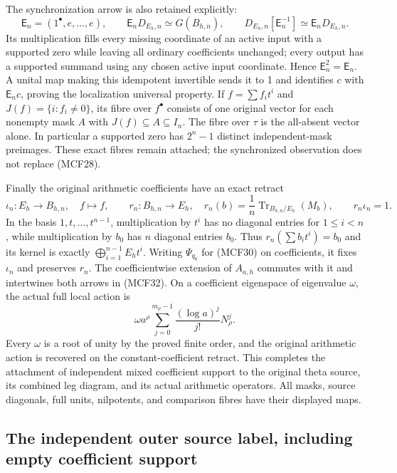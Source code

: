 \documentclass[11pt,a4paper]{article}
\begin{document}
The synchronization arrow is also retained explicitly:
\[
\mathsf E_n=(1^\bullet,e,\ldots,e),\qquad
\mathsf E_nD_{E_h,n}\simeq G(B_{h,n}),\qquad
D_{E_h,n}[\mathsf E_n^{-1}]\simeq\mathsf E_nD_{E_h,n}.
\tag{MCF31}
\]
Its multiplication fills every missing coordinate of an active input
with a supported zero while leaving all ordinary coefficients unchanged;
every output has a supported summand using any chosen active input
coordinate.  Hence $\mathsf E_n^2=\mathsf E_n$.  A unital map making
this idempotent invertible sends it to 1 and identifies $c$ with
$\mathsf E_nc$, proving the localization universal property.
If $f=\sum f_it^i$ and $J(f)=\{i:f_i\ne0\}$, its fibre over
$f^\bullet$ consists of one original vector for each nonempty mask
$A$ with $J(f)\subseteq A\subseteq I_n$.  The fibre over $\tau$ is
the all-absent vector alone.  In particular a supported zero has
$2^n-1$ distinct independent-mask preimages.  These exact fibres remain
attached; the synchronized observation does not replace (MCF28).

Finally the original arithmetic coefficients have an exact retract
\[
\iota_n:E_h\longrightarrow B_{h,n},\quad f\mapsto f,
\qquad r_n:B_{h,n}\longrightarrow E_h,
\quad r_n(b)=\frac1n\operatorname{Tr}_{B_{h,n}/E_h}(M_b),
\qquad r_n\iota_n=1.
\tag{MCF32}
\]
In the basis $1,t,\ldots,t^{n-1}$, multiplication by $t^i$ has no
diagonal entries for $1\leq i<n$, while multiplication by $b_0$
has $n$ diagonal entries $b_0$.  Thus $r_n(\sum b_it^i)=b_0$ and
its kernel is exactly $\bigoplus_{i=1}^{n-1}E_ht^i$.
Writing $\Psi_{q_0}$ for (MCF30) on coefficients, it fixes $\iota_n$
and preserves $r_n$.  The coefficientwise extension of $A_{a,h}$
commutes with it and intertwines both arrows in (MCF32).  On a coefficient
eigenspace of eigenvalue $\omega$, the actual full local action is
\[
\omega a^\rho\sum_{j=0}^{m_\rho-1}
          \frac{(\log a)^j}{j!}N_\rho^j.
\tag{MCF33}
\]
Every $\omega$ is a root of unity by the proved finite order, and the
original arithmetic action is recovered on the constant-coefficient
retract.  This completes the attachment of independent mixed coefficient
support to the original theta source, its combined leg diagram, and its
actual arithmetic operators.  All masks, source diagonals, full units,
nilpotents, and comparison fibres have their displayed maps.

\subsection{The independent outer source label, including empty coefficient support}
\end{document}
